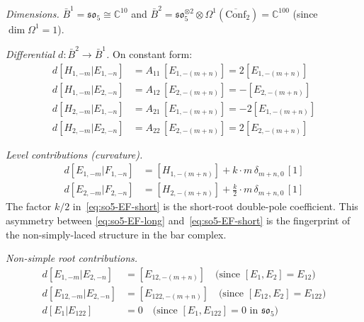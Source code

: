 \begin{computation}
\label{comp:so5-bar-deg2}

\emph{Dimensions.}
$\bar{B}^1 = \mathfrak{so}_5 \cong \mathbb{C}^{10}$ and
$\bar{B}^2 = \mathfrak{so}_5^{\otimes 2} \otimes \Omega^1(\overline{\mathrm{Conf}}_2)
= \mathbb{C}^{100}$ (since $\dim \Omega^1 = 1$).

\emph{Differential $d\colon \bar{B}^2 \to \bar{B}^1$.}
On constant form:
\begin{align}
d[H_{1,-m}|E_{1,-n}] &= A_{11}\,[E_{1,-(m+n)}] = 2[E_{1,-(m+n)}]
\label{eq:so5-HE-long} \\
d[H_{1,-m}|E_{2,-n}] &= A_{12}\,[E_{2,-(m+n)}] = -[E_{2,-(m+n)}]
\label{eq:so5-HE-short} \\
d[H_{2,-m}|E_{1,-n}] &= A_{21}\,[E_{1,-(m+n)}] = -2[E_{1,-(m+n)}]
\label{eq:so5-H2E1} \\
d[H_{2,-m}|E_{2,-n}] &= A_{22}\,[E_{2,-(m+n)}] = 2[E_{2,-(m+n)}]
\label{eq:so5-H2E2}
\end{align}

\emph{Level contributions (curvature).}
\begin{align}
d[E_{1,-m}|F_{1,-n}] &= [H_{1,-(m+n)}] + k \cdot m\,\delta_{m+n,0}\,[1]
\label{eq:so5-EF-long} \\
d[E_{2,-m}|F_{2,-n}] &= [H_{2,-(m+n)}] + \tfrac{k}{2}\cdot m\,\delta_{m+n,0}\,[1]
\label{eq:so5-EF-short}
\end{align}
The factor $k/2$ in~\eqref{eq:so5-EF-short} is the short-root
double-pole coefficient.  This asymmetry between
\eqref{eq:so5-EF-long} and~\eqref{eq:so5-EF-short} is the
fingerprint of the non-simply-laced structure in the bar complex.

\emph{Non-simple root contributions.}
\begin{align}
d[E_{1,-m}|E_{2,-n}] &= [E_{12,-(m+n)}]
\quad\text{(since $[E_1, E_2] = E_{12}$)} \\
d[E_{12,-m}|E_{2,-n}] &= [E_{122,-(m+n)}]
\quad\text{(since $[E_{12}, E_2] = E_{122}$)} \\
d[E_1|E_{122}] &= 0
\quad\text{(since $[E_1, E_{122}] = 0$ in $\mathfrak{so}_5$)}
\end{align}
\end{computation}


